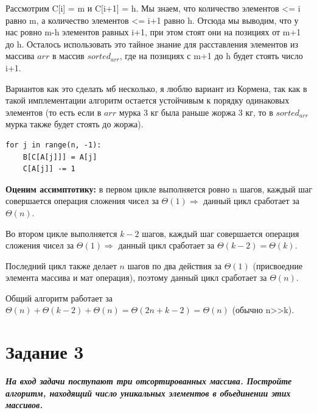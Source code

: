 \documentclass{article}
\begin{document}
Рассмотрим C[i] = m и C[i+1] = h. Мы знаем, что количество элементов <= i равно m, а количество элементов <= i+1 равно h. Отсюда мы выводим, что у нас ровно m-h элементов равных i+1, при этом стоят они на позициях от m+1 до h. Осталось использовать это тайное знание для расставления элементов из массива $arr$ в массив $sorted_{arr}$, где на позициях с m+1 до h будет стоять число i+1.

Вариантов как это сделать мб несколько, я люблю вариант из Кормена, так как в такой имплементации алгоритм остается устойчивым к порядку одинаковых элементов (то есть если в $arr$ мурка 3 кг была раньше жоржа 3 кг, то в $sorted_{arr}$ мурка также будет стоять до жоржа).

\begin{verbatim}
for j in range(n, -1):
    B[C[A[j]]] = A[j]  
    C[A[j]] -= 1
\end{verbatim}


\textbf{Оценим ассимптотику:} в первом цикле выполняется ровно n шагов, каждый шаг совершается операция сложения чисел за $\Theta(1) \Rightarrow$ данный цикл сработает за $\Theta(n)$.

Во втором цикле выполняется $k-2$ шагов, каждый шаг совершается операция сложения чисел за $\Theta(1) \Rightarrow$ данный цикл сработает за $\Theta(k-2) = \Theta(k)$.

Последний цикл также делает $n$ шагов по два действия за $\Theta(1)$ (присвоедние элемента массива и мат операция), поэтому данный цикл сработает за $\Theta(n)$.

Общий алгоритм работает за $\Theta(n) + \Theta(k-2) + \Theta(n) = \Theta(2n + k - 2) = \Theta(n)$ (обычно n>>k).



\bigskip


\section*{\textbf{Задание 3}} \textbf{\textit{На вход задачи поступают три отсортированных массива. Постройте алгоритм, находящий число уникальных элементов в объединении этих массивов.}}
\end{document}
